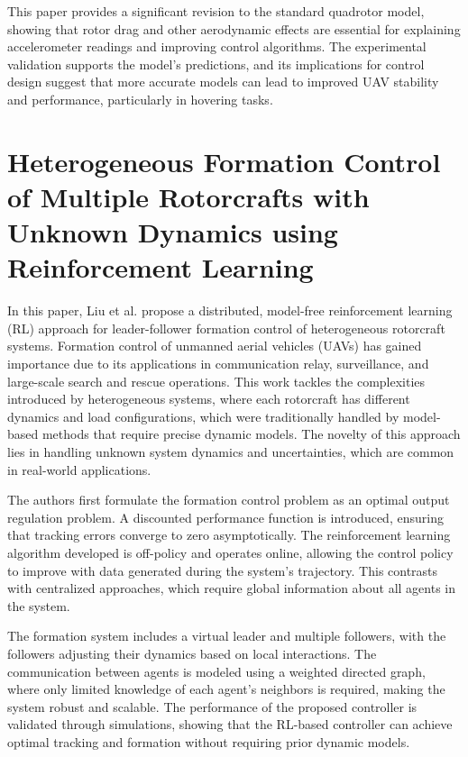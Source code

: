 \documentclass[a4paper,12pt]{article}
\begin{document}
This paper provides a significant revision to the standard quadrotor model, showing that rotor drag and other aerodynamic effects are essential for explaining accelerometer readings and improving control algorithms. The experimental validation supports the model’s predictions, and its implications for control design suggest that more accurate models can lead to improved UAV stability and performance, particularly in hovering tasks.

\section{Heterogeneous Formation Control of Multiple Rotorcrafts with Unknown Dynamics using Reinforcement Learning \cite{liu2019heterogeneous}}
In this paper, Liu et al. propose a distributed, model-free reinforcement learning (RL) approach for leader-follower formation control of heterogeneous rotorcraft systems. Formation control of unmanned aerial vehicles (UAVs) has gained importance due to its applications in communication relay, surveillance, and large-scale search and rescue operations. This work tackles the complexities introduced by heterogeneous systems, where each rotorcraft has different dynamics and load configurations, which were traditionally handled by model-based methods that require precise dynamic models. The novelty of this approach lies in handling unknown system dynamics and uncertainties, which are common in real-world applications.

The authors first formulate the formation control problem as an optimal output regulation problem. A discounted performance function is introduced, ensuring that tracking errors converge to zero asymptotically. The reinforcement learning algorithm developed is off-policy and operates online, allowing the control policy to improve with data generated during the system’s trajectory. This contrasts with centralized approaches, which require global information about all agents in the system.

The formation system includes a virtual leader and multiple followers, with the followers adjusting their dynamics based on local interactions. The communication between agents is modeled using a weighted directed graph, where only limited knowledge of each agent's neighbors is required, making the system robust and scalable. The performance of the proposed controller is validated through simulations, showing that the RL-based controller can achieve optimal tracking and formation without requiring prior dynamic models.
\end{document}
